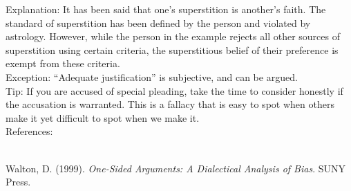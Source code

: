 \documentclass[a4paper,12pt,single,pdftex]{scrartcl}
\begin{document}
{    
      Explanation: It has been said that one’s superstition is another’s faith.  The standard of superstition has been defined by the person and violated by astrology.  However, while the person in the example rejects all other sources of superstition using certain criteria, the superstitious belief of their preference is exempt from these criteria.
    \\

    
      Exception: “Adequate justification” is subjective, and can be argued.
    \\

    
      Tip: If you are accused of special pleading, take the time to consider honestly if the accusation is warranted.  This is a fallacy that is easy to spot when others make it yet difficult to spot when we make it.
    \\

    References:

    
      
        
      \\

      
        
          Walton, D. (1999). {\it One-Sided Arguments: A Dialectical Analysis of Bias}. SUNY Press.
        
      
    
  }
\end{document}
